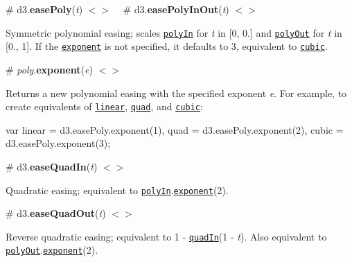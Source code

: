 \href{http://bl.ocks.org/mbostock/248bac3b8e354a9103c4/#polyOut}{\tt }

\label{_easePoly}%
\# d3.{\bfseries ease\+Poly}({\itshape t}) \href{https://github.com/d3/d3-ease/blob/master/src/poly.js}{\tt $<$$>$} ~\newline
\label{_easePolyInOut}%
\# d3.{\bfseries ease\+Poly\+In\+Out}({\itshape t}) \href{https://github.com/d3/d3-ease/blob/master/src/poly.js#L27}{\tt $<$$>$}

Symmetric polynomial easing; scales \href{#easePolyIn}{\tt poly\+In} for {\itshape t} in \mbox{[}0, 0.\mbox{]} and \href{#easePolyOut}{\tt poly\+Out} for {\itshape t} in \mbox{[}0., 1\mbox{]}. If the \href{#poly_exponent}{\tt exponent} is not specified, it defaults to 3, equivalent to \href{#easeCubic}{\tt cubic}.

\href{http://bl.ocks.org/mbostock/248bac3b8e354a9103c4/#polyInOut}{\tt }

\label{_poly_exponent}%
\# {\itshape poly}.{\bfseries exponent}({\itshape e}) \href{https://github.com/d3/d3-ease/blob/master/src/poly.js#L1}{\tt $<$$>$}

Returns a new polynomial easing with the specified exponent {\itshape e}. For example, to create equivalents of \href{#easeLinear}{\tt linear}, \href{#easeQuad}{\tt quad}, and \href{#easeCubic}{\tt cubic}\+:


\begin{DoxyCode}
var linear = d3.easePoly.exponent(1),
    quad = d3.easePoly.exponent(2),
    cubic = d3.easePoly.exponent(3);
\end{DoxyCode}


\label{_easeQuadIn}%
\# d3.{\bfseries ease\+Quad\+In}({\itshape t}) \href{https://github.com/d3/d3-ease/blob/master/src/quad.js#L1}{\tt $<$$>$}

Quadratic easing; equivalent to \href{#easePolyIn}{\tt poly\+In}.\href{#poly_exponent}{\tt exponent}(2).

\href{http://bl.ocks.org/mbostock/248bac3b8e354a9103c4/#quadIn}{\tt }

\label{_easeQuadOut}%
\# d3.{\bfseries ease\+Quad\+Out}({\itshape t}) \href{https://github.com/d3/d3-ease/blob/master/src/quad.js#L5}{\tt $<$$>$}

Reverse quadratic easing; equivalent to 1 -\/ \href{#easeQuadIn}{\tt quad\+In}(1 -\/ {\itshape t}). Also equivalent to \href{#easePolyOut}{\tt poly\+Out}.\href{#poly_exponent}{\tt exponent}(2).

\href{http://bl.ocks.org/mbostock/248bac3b8e354a9103c4/#quadOut}{\tt }

